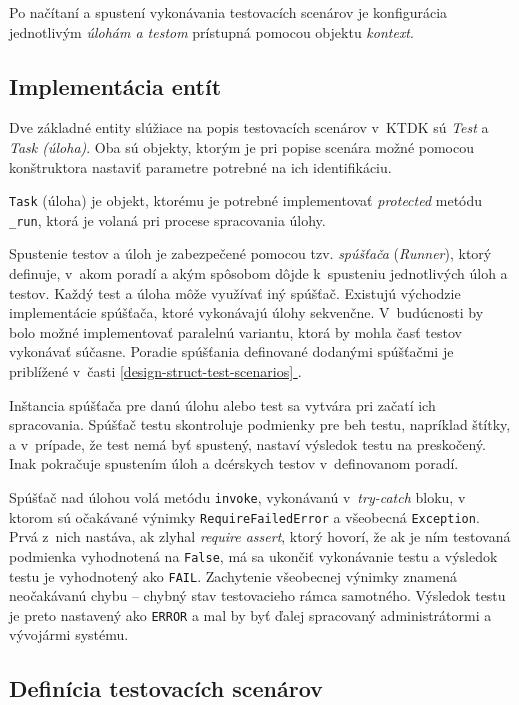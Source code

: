\documentclass[
  digital, %
  oneside, %
  table,   %
  lof,     %
  lot,   %
]{fithesis3}
\newcommand*{\fullref}[1]{\hyperref[{#1}]{\ref*{#1} \nameref*{#1}}}
\begin{document}
Po načítaní a spustení vykonávania testovacích scenárov je konfigurácia jednotlivým \emph{úlohám a testom} prístupná pomocou objektu \emph{kontext}.


\subsection{Implementácia entít}

Dve základné entity slúžiace na popis testovacích scenárov v~KTDK sú \emph{Test} a \emph{Task (úloha)}. Oba sú objekty, ktorým je pri popise scenára možné pomocou konštruktora nastaviť parametre potrebné na ich identifikáciu. 

\texttt{Task} (úloha) je objekt, ktorému je potrebné implementovať \emph{protected} metódu \texttt{\_run}, ktorá je volaná pri procese spracovania úlohy.

Spustenie testov a úloh je zabezpečené pomocou tzv. \emph{spúšťača} (\emph{Runner}), ktorý definuje, v~akom poradí a akým spôsobom dôjde k~spusteniu jednotlivých úloh a testov. Každý test a úloha môže využívať iný spúšťač. Existujú východzie implementácie spúšťača, ktoré vykonávajú úlohy sekvenčne. V~budúcnosti by bolo možné implementovať paralelnú variantu, ktorá by mohla časť testov vykonávať súčasne. Poradie spúšťania definované dodanými spúšťačmi je priblížené v~časti \fullref{design-struct-test-scenarios}.

Inštancia spúšťača pre danú úlohu alebo test sa vytvára pri začatí ich spracovania. Spúšťač testu skontroluje podmienky pre beh testu, napríklad štítky, a v~prípade, že test nemá byť spustený, nastaví výsledok testu na preskočený. Inak pokračuje spustením úloh a dcérskych testov v~definovanom poradí.

Spúšťač nad úlohou volá metódu \texttt{invoke}, vykonávanú v~\emph{try-catch} bloku, v ktorom sú očakávané výnimky \texttt{RequireFailedError} a všeobecná \texttt{Exception}. Prvá z~nich nastáva, ak zlyhal \emph{require assert}, ktorý hovorí, že ak je ním testovaná podmienka vyhodnotená na \texttt{False}, má sa ukončiť vykonávanie testu a výsledok testu je vyhodnotený ako \texttt{FAIL}. Zachytenie všeobecnej výnimky znamená neočakávanú chybu -- chybný stav testovacieho rámca samotného. Výsledok testu je preto nastavený ako \texttt{ERROR} a mal by byť ďalej spracovaný administrátormi a vývojármi systému.

\subsection{Definícia testovacích scenárov}
\end{document}
